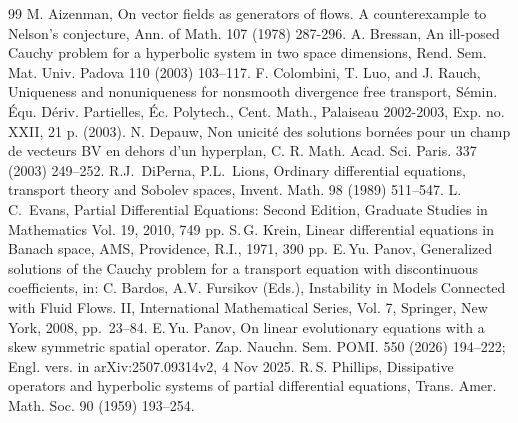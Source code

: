 \documentclass[12pt]{article}
\theoremstyle{plain}
\theoremstyle{definition}
\numberwithin{equation}{section}
\begin{document}
\begin{thebibliography}{99}
\itemsep=-2pt
M. Aizenman, On vector fields as generators of flows. A counterexample
to Nelson's conjecture, Ann. of Math. 107 (1978) 287-296.
A. Bressan, An ill-posed Cauchy problem for a hyperbolic system in two
space dimensions, Rend. Sem. Mat. Univ. Padova 110 (2003) 103--117.
F. Colombini, T. Luo, and J. Rauch, Uniqueness and nonuniqueness
for nonsmooth divergence free transport, S\'emin. \'Equ. D\'eriv. Partielles,
\'Ec. Polytech., Cent. Math., Palaiseau 2002-2003, Exp. no. XXII, 21 p.
(2003).
N. Depauw, Non unicit\'e des solutions born\'ees pour un champ de vecteurs BV en dehors d'un hyperplan,
C. R. Math. Acad. Sci. Paris. 337 (2003) 249--252.
R.J.~DiPerna, P.L.~Lions, Ordinary differential equations, transport
theory and Sobolev spaces, Invent. Math. 98 (1989) 511--547.
L.\,C.~Evans, Partial Differential Equations: Second Edition, Graduate Studies in Mathematics
Vol. 19, 2010, 749 pp.
S.\,G. Krein, Linear differential equations in Banach space, AMS, Providence, R.I., 1971, 390 pp.
E.\,Yu. Panov, Generalized solutions of the Cauchy problem for a transport equation
with discontinuous coefficients, in: C. Bardos, A.V. Fursikov (Eds.), Instability in Models Connected with Fluid Flows. II, International Mathematical Series, Vol. 7, Springer, New York, 2008, pp.~23--84.
E.\,Yu. Panov, On linear evolutionary equations with a skew symmetric spatial operator. Zap. Nauchn. Sem. POMI. 550 (2026) 194--222; Engl. vers. in arXiv:2507.09314v2, 4 Nov 2025.
R.\,S. Phillips, Dissipative operators and hyperbolic systems of partial differential equations, Trans. Amer. Math. Soc. 90 (1959) 193--254.
\end{thebibliography}
\end{document}
